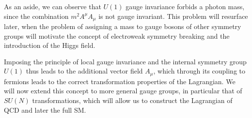 As an aside, we can observe that $U(1)$ gauge invariance forbids a photon
mass, since the combination $m^2A^\mu A_\mu$ is not gauge
invariant. This problem will resurface later, when the problem of
assigning a mass to gauge bosons of other symmetry groups will
motivate the concept of electroweak symmetry breaking and the introduction of
the Higgs field. 

Imposing the principle of local gauge invariance and the internal
symmetry group $U(1)$ thus leads to the additional vector field
$A_\mu$, which through its coupling to fermions leads to the correct
transformation properties of the Lagrangian. We will now extend this
concept to more general gauge groups, in particular that of $SU(N)$
transformations, which will allow us to construct the Lagrangian of
QCD and later the full SM.

